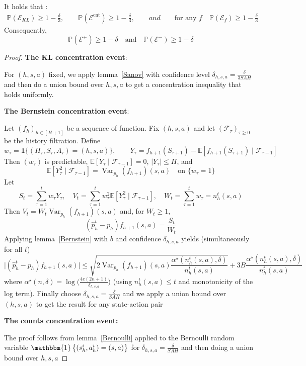 \documentclass[final,12pt]{colt2026} %
\begin{document}
\begin{lemma}\label{good event}
    It holds that :
    \begin{align*}
        \mathbb{P}(\mathcal{E}_{KL}) \geq 1 - \frac{\delta}{3}, \qquad \mathbb{P}(\mathcal{E}^{\text{cnt}}) \geq 1 - \frac{\delta}{3}, \qquad \textit{and} \qquad \text{for any $f$} \quad \mathbb{P}(\mathcal{E}_f) \geq 1 - \frac{\delta}{3}
    \end{align*}
    Consequently,
    $$
    \mathbb{P}(\mathcal{E}^+) \geq 1 - \delta \quad \text{and} \quad \mathbb{P}(\mathcal{E}^-) \geq 1 - \delta
    $$
    \end{lemma}
\begin{proof}

\textbf{The KL concentration event}: 

For $(h,s,a)$ fixed, we apply lemma~\ref{Sanov} with confidence level $\delta_{h,s,a} =\frac{\delta}{3SAH}$ and then do a union bound over $h,s,a$ to get a concentration inequality that holds uniformly.

\textbf{The Bernstein concentration event}:

Let $(f_h)_{h\in[H+1]}$ be a sequence of function. Fix $(h,s,a)$ and let $(\mathcal F_\tau)_{\tau\ge0}$ be the history filtration. Define
$$
w_\tau=\mathbf 1\{(H_\tau,S_\tau,A_\tau)=(h,s,a)\},\qquad
Y_\tau=f_{h+1}(S_{\tau+1})-\mathbb{E}[f_{h+1}(S_{\tau+1})\mid \mathcal F_{\tau-1}]
$$
Then $(w_\tau)$ is predictable, $\mathbb{E}[Y_\tau\mid\mathcal F_{\tau-1}]=0$, $|Y_\tau|\le H$, and
$$
\mathbb{E}[Y_\tau^2\mid\mathcal F_{\tau-1}]=\operatorname{Var}_{p_h}(f_{h+1})(s,a)\quad\text{on }\{w_\tau=1\}
$$
Let
$$
S_t=\sum_{\tau=1}^t w_\tau Y_\tau,\quad
V_t=\sum_{\tau=1}^t w_\tau^2\mathbb{E}[Y_\tau^2\mid\mathcal F_{\tau-1}],\quad
W_t=\sum_{\tau=1}^t w_\tau=n_h^t(s,a)
$$
Then $V_t=W_t\operatorname{Var}_{p_h}(f_{h+1})(s,a)$ and, for $W_t\ge1$,
$$
(\widehat p_h^t-p_h)f_{h+1}(s,a)=\frac{S_t}{W_t}
$$
Applying lemma~\ref{Bernstein} with $b$ and confidence $\delta_{h,s,a}$ yields (simultaneously for all $t$)
$$
\Big|(\widehat p_h^t-p_h)f_{h+1}(s,a)\Big|
\leq
\sqrt{2\operatorname{Var}_{p_h}(f_{h+1})(s,a)\frac{\alpha^\star(n_h^t(s,a),\delta)}{n_h^t(s,a)}}
+
3B\frac{\alpha^\star(n_h^t(s,a),\delta)}{n_h^t(s,a)}
$$
where $\alpha^\star(n,\delta)=\log\big(\frac{4e(2n+1)}{\delta_{h,s,a}}\big)$ (using $n_h^t(s,a)\le t$ and monotonicity of the log term).
Finally choose $\delta_{h,s,a}=\frac{\delta}{SAH}$ and we apply a union bound over $(h,s,a)$ to get the result for any state-action pair

\textbf{The counts concentration event:}

The proof follows from lemma~\ref{Bernoulli} applied to the Bernoulli random variable $\mathbbm{1}\left\{ (s_h^i, a_h^i) = (s, a) \right\}$ for $\delta_{h,s,a} = \frac{\delta}{SAH}$ and then doing a union bound over $h,s,a$
\end{proof}
\end{document}
